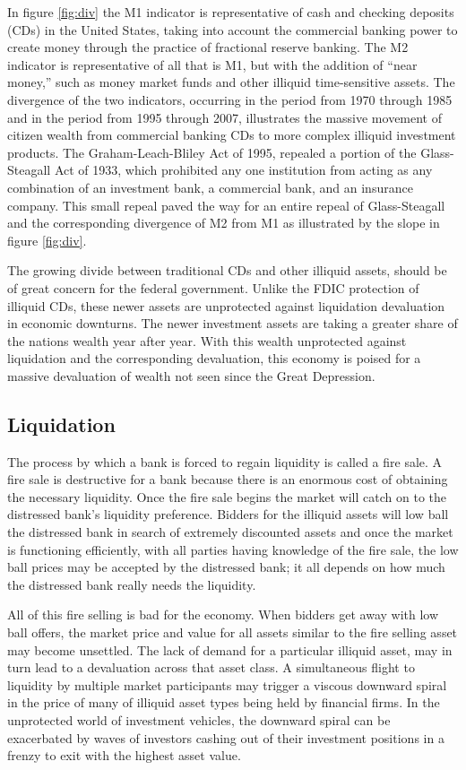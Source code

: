 In figure \ref{fig:div} the M1 indicator is representative of cash and checking deposits (CDs) in the United States, taking into account the commercial banking power to create money through the practice of fractional reserve banking.  The M2 indicator is representative of all that is M1, but with the addition of ``near money,'' such as money market funds and other illiquid time-sensitive assets.  The divergence of the two indicators, occurring in the period from 1970 through 1985 and in the period from 1995 through 2007, illustrates the massive movement of citizen wealth from commercial banking CDs to more complex illiquid investment products.  The Graham-Leach-Bliley Act of 1995, repealed a portion of the Glass-Steagall Act of 1933, which prohibited any one institution from acting as any combination of an investment bank, a commercial bank, and an insurance company.  This small repeal paved the way for an entire repeal of Glass-Steagall and the corresponding divergence of M2 from M1 as illustrated by the slope in figure \ref{fig:div}.

The growing divide between traditional CDs and other illiquid assets, should be of great concern for the federal government.  Unlike the FDIC protection of illiquid CDs, these newer assets are unprotected against liquidation devaluation in economic downturns.  The newer investment assets are taking a greater share of the nations wealth year after year.  With this wealth unprotected against liquidation and the corresponding devaluation, this economy is poised for a massive devaluation of wealth not seen since the Great Depression.  


\subsection{Liquidation}
The process by which a bank is forced to regain liquidity is called a fire sale.  A fire sale is destructive for a bank because there is an enormous cost of obtaining the necessary liquidity.  Once the fire sale begins the market will catch on to the distressed bank's liquidity preference.  Bidders for the illiquid assets will low ball the distressed bank in search of extremely discounted assets and once the market is functioning efficiently, with all parties having knowledge of the fire sale, the low ball prices may be accepted by the distressed bank; it all depends on how much the distressed bank really needs the liquidity.

All of this fire selling is bad for the economy.  When bidders get away with low ball offers, the market price and value for all assets similar to the fire selling asset may become unsettled.  The lack of demand for a particular illiquid asset, may in turn lead to a devaluation across that asset class.  A simultaneous flight to liquidity by multiple market participants may trigger a viscous downward spiral in the price of many of illiquid asset types being held by financial firms.  In the unprotected world of investment vehicles, the downward spiral can be exacerbated by waves of investors cashing out of their investment positions in a frenzy to exit with the highest asset value.

